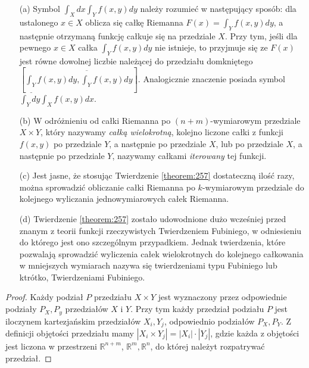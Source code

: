\documentclass[leqno]{article}
\begin{document}
\begin{justify}
\begin{uwaga}
    \begin{itemize}
        \item [(a)]
            Symbol $\int_{X}dx\int_{Y}f(x,y)dy$ należy rozumieć w następujący sposób: dla ustalonego $x \in X$ oblicza się 
            całkę Riemanna $F(x) = \int_{Y}f(x,y)dy$, a następnie otrzymaną funkcję całkuje się na przedziale $X$. Przy tym, jeśli 
            dla pewnego $x \in X$ całka $\int_Y f(x,y)dy$ nie istnieje, to przyjmuje się ze $F(x)$ jest równe dowolnej liczbie należącej do przedziału domkniętego 
            $[\underline{\int_{Y}}f(x,y)dy, \overline{\int_{Y}}f(x,y)dy]$. Analogicznie znaczenie posiada symbol $\int_{Y}dy\int_{X}f(x,y)dx$.
        \item [(b)]
            W odróżnieniu od całki Riemanna po $(n+m)$-wymiarowym przedziale $X \times Y$, który nazywamy \textit{całką wielokrotną}, 
            kolejno liczone całki z funkcji $f(x,y)$ po przedziale $Y$, a następnie po przedziale $X$, lub po przedziale $X$, a następnie po przedziale $Y$, nazywamy całkami \textit{iterowany} tej funkcji.
        \item [(c)]
            Jest jasne, że stosując Twierdzenie \ref{theorem:257} dostateczną ilość razy, można sprowadzić obliczanie całki Riemanna po $k$-wymiarowym przedziale do kolejnego wyliczania jednowymiarowych całek Riemanna.
        \item [(d)]
            Twierdzenie \ref{theorem:257} zostało udowodnione dużo wcześniej przed znanym z teorii funkcji rzeczywistych Twierdzeniem Fubiniego, w odniesieniu do którego
            jest ono szczególnym przypadkiem. Jednak twierdzenia, które pozwalają sprowadzić wyliczenia całek wielokrotnych do kolejnego całkowania w mniejszych wymiarach 
            nazywa się twierdzeniami typu Fubiniego lub ktrótko, Twierdzeniami Fubiniego.
    \end{itemize}
\end{uwaga}

\begin{proof}
    Każdy podział $P$ przedziału $X \times Y$ jest wyznaczony przez odpowiednie podziały $P_X, P_y$ przedziałów $X$ i $Y$.
    Przy tym każdy przedział podziału $P$ jest iloczynem kartezjańskim przedziałów $X_i, Y_j$, odpowiednio podziałów $P_X, P_Y$. 
    Z definicji objętości przedziału mamy $|X_i \times Y_j| = |X_i| \cdot |Y_j|$, gdzie każda z objętości jest liczona w przestrzeni $\mathbb{R}^{n+m}$, $\mathbb{R}^m, \mathbb{R}^n$,
    do której należyt rozpatrywać przedział. 


\end{proof}
\end{justify}
\end{document}
